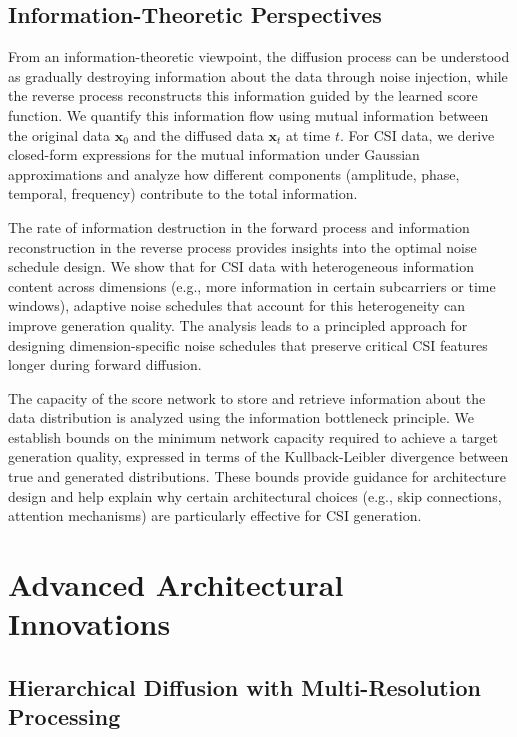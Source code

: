 \documentclass[journal]{IEEEtran}
\begin{document}
\subsection{Information-Theoretic Perspectives}

From an information-theoretic viewpoint, the diffusion process can be understood as gradually destroying information about the data through noise injection, while the reverse process reconstructs this information guided by the learned score function. We quantify this information flow using mutual information between the original data $\mathbf{x}_0$ and the diffused data $\mathbf{x}_t$ at time $t$. For CSI data, we derive closed-form expressions for the mutual information under Gaussian approximations and analyze how different components (amplitude, phase, temporal, frequency) contribute to the total information.

The rate of information destruction in the forward process and information reconstruction in the reverse process provides insights into the optimal noise schedule design. We show that for CSI data with heterogeneous information content across dimensions (e.g., more information in certain subcarriers or time windows), adaptive noise schedules that account for this heterogeneity can improve generation quality. The analysis leads to a principled approach for designing dimension-specific noise schedules that preserve critical CSI features longer during forward diffusion.

The capacity of the score network to store and retrieve information about the data distribution is analyzed using the information bottleneck principle. We establish bounds on the minimum network capacity required to achieve a target generation quality, expressed in terms of the Kullback-Leibler divergence between true and generated distributions. These bounds provide guidance for architecture design and help explain why certain architectural choices (e.g., skip connections, attention mechanisms) are particularly effective for CSI generation.

\section{Advanced Architectural Innovations}

\subsection{Hierarchical Diffusion with Multi-Resolution Processing}
\end{document}
